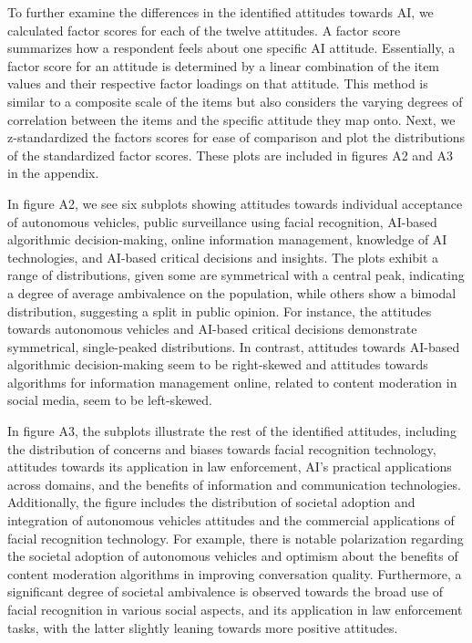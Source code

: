 To further examine the differences in the identified attitudes towards AI, we calculated factor scores for each of the twelve attitudes. A factor score summarizes how a respondent feels about one specific AI attitude. Essentially, a factor score for an attitude is determined by a linear combination of the item values and their respective factor loadings on that attitude. This method is similar to a composite scale of the items but also considers the varying degrees of correlation between the items and the specific attitude they map onto. Next, we z-standardized the factors scores for ease of comparison and plot the distributions of the standardized factor scores. These plots are included in figures A2 and A3 in the appendix. 

In figure A2, we see six subplots showing attitudes towards individual acceptance of autonomous vehicles, public surveillance using facial recognition, AI-based algorithmic decision-making, online information management, knowledge of AI technologies, and AI-based critical decisions and insights. The plots exhibit a range of distributions, given some are symmetrical with a central peak, indicating a degree of average ambivalence on the population, while others show a bimodal distribution, suggesting a split in public opinion. For instance, the attitudes towards autonomous vehicles and AI-based critical decisions demonstrate symmetrical, single-peaked distributions. In contrast, attitudes towards AI-based algorithmic decision-making seem to be right-skewed and attitudes towards algorithms for information management online, related to content moderation in social media, seem to be left-skewed. 

In figure A3, the subplots illustrate the rest of the identified attitudes, including the distribution of concerns and biases towards facial recognition technology, attitudes towards its application in law enforcement, AI's practical applications across domains, and the benefits of information and communication technologies. Additionally, the figure includes the distribution of societal adoption and integration of autonomous vehicles attitudes and the commercial applications of facial recognition technology. For example, there is notable polarization regarding the societal adoption of autonomous vehicles and optimism about the benefits of content moderation algorithms in improving conversation quality. Furthermore, a significant degree of societal ambivalence is observed towards the broad use of facial recognition in various social aspects, and its application in law enforcement tasks, with the latter slightly leaning towards more positive attitudes.

